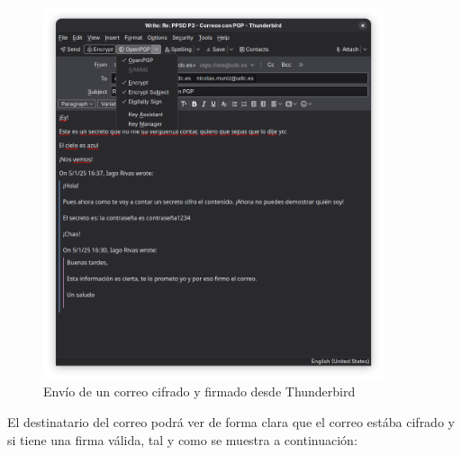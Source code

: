 \begin{figure}[H]
    \centering
    \includegraphics[width=10cm]{thunderbird-cifrado-firmado.png}
    \caption{Envío de un correo cifrado y firmado desde Thunderbird}
\end{figure}

El destinatario del correo podrá ver de forma clara que el correo estába cifrado y si tiene una firma válida, tal y como se muestra a continuación:

